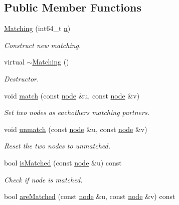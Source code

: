 \subsection*{Public Member Functions}
\begin{DoxyCompactItemize}
\item 
\hyperlink{class_networ_kit_1_1_matching_a9d358cca48ef83b667e7eb9095dc7699}{Matching} (int64\-\_\-t \hyperlink{class_networ_kit_1_1_index_map_aabb9796ff1a0c002446b14ff7d4fffbc}{n})
\begin{DoxyCompactList}\small\item\em Construct new matching. \end{DoxyCompactList}\item 
virtual \hyperlink{class_networ_kit_1_1_matching_a09f6410ab15dbe1875691c2c96906052}{$\sim$\-Matching} ()
\begin{DoxyCompactList}\small\item\em Destructor. \end{DoxyCompactList}\item 
void \hyperlink{class_networ_kit_1_1_matching_a09ae97510791ef8a5165c76944f8f02e}{match} (const \hyperlink{namespace_networ_kit_a61914158fd771265be48de9942369160}{node} \&u, const \hyperlink{namespace_networ_kit_a61914158fd771265be48de9942369160}{node} \&v)
\begin{DoxyCompactList}\small\item\em Set two nodes as eachothers matching partners. \end{DoxyCompactList}\item 
void \hyperlink{class_networ_kit_1_1_matching_a66a2ced23196544647da2a605956e491}{unmatch} (const \hyperlink{namespace_networ_kit_a61914158fd771265be48de9942369160}{node} \&u, const \hyperlink{namespace_networ_kit_a61914158fd771265be48de9942369160}{node} \&v)
\begin{DoxyCompactList}\small\item\em Reset the two nodes to unmatched. \end{DoxyCompactList}\item 
bool \hyperlink{class_networ_kit_1_1_matching_abf1ff6be646ccfb468f568ea4951cee5}{is\-Matched} (const \hyperlink{namespace_networ_kit_a61914158fd771265be48de9942369160}{node} \&u) const 
\begin{DoxyCompactList}\small\item\em Check if node is matched. \end{DoxyCompactList}\item 
bool \hyperlink{class_networ_kit_1_1_matching_ad2920bb96b22c8f860ba7d465217eb59}{are\-Matched} (const \hyperlink{namespace_networ_kit_a61914158fd771265be48de9942369160}{node} \&u, const \hyperlink{namespace_networ_kit_a61914158fd771265be48de9942369160}{node} \&v) const 

\end{DoxyCompactItemize}
